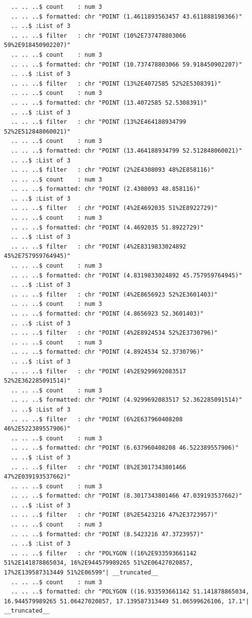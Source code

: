 \documentclass[
  letterpaper,
  DIV=11,
  numbers=noendperiod]{scrartcl}
\begin{document}
\begin{verbatim}
  .. .. ..$ count    : num 3
  .. .. ..$ formatted: chr "POINT (1.4611893563457 43.611888198366)"
  .. ..$ :List of 3
  .. .. ..$ filter   : chr "POINT (10%2E737478803066 59%2E918450902207)"
  .. .. ..$ count    : num 3
  .. .. ..$ formatted: chr "POINT (10.737478803066 59.918450902207)"
  .. ..$ :List of 3
  .. .. ..$ filter   : chr "POINT (13%2E4072585 52%2E5308391)"
  .. .. ..$ count    : num 3
  .. .. ..$ formatted: chr "POINT (13.4072585 52.5308391)"
  .. ..$ :List of 3
  .. .. ..$ filter   : chr "POINT (13%2E464188934799 52%2E512848060021)"
  .. .. ..$ count    : num 3
  .. .. ..$ formatted: chr "POINT (13.464188934799 52.512848060021)"
  .. ..$ :List of 3
  .. .. ..$ filter   : chr "POINT (2%2E4308093 48%2E858116)"
  .. .. ..$ count    : num 3
  .. .. ..$ formatted: chr "POINT (2.4308093 48.858116)"
  .. ..$ :List of 3
  .. .. ..$ filter   : chr "POINT (4%2E4692035 51%2E8922729)"
  .. .. ..$ count    : num 3
  .. .. ..$ formatted: chr "POINT (4.4692035 51.8922729)"
  .. ..$ :List of 3
  .. .. ..$ filter   : chr "POINT (4%2E8319833024892 45%2E757959764945)"
  .. .. ..$ count    : num 3
  .. .. ..$ formatted: chr "POINT (4.8319833024892 45.757959764945)"
  .. ..$ :List of 3
  .. .. ..$ filter   : chr "POINT (4%2E8656923 52%2E3601403)"
  .. .. ..$ count    : num 3
  .. .. ..$ formatted: chr "POINT (4.8656923 52.3601403)"
  .. ..$ :List of 3
  .. .. ..$ filter   : chr "POINT (4%2E8924534 52%2E3730796)"
  .. .. ..$ count    : num 3
  .. .. ..$ formatted: chr "POINT (4.8924534 52.3730796)"
  .. ..$ :List of 3
  .. .. ..$ filter   : chr "POINT (4%2E9299692083517 52%2E362285091514)"
  .. .. ..$ count    : num 3
  .. .. ..$ formatted: chr "POINT (4.9299692083517 52.362285091514)"
  .. ..$ :List of 3
  .. .. ..$ filter   : chr "POINT (6%2E637960408208 46%2E522389557906)"
  .. .. ..$ count    : num 3
  .. .. ..$ formatted: chr "POINT (6.637960408208 46.522389557906)"
  .. ..$ :List of 3
  .. .. ..$ filter   : chr "POINT (8%2E3017343801466 47%2E039193537662)"
  .. .. ..$ count    : num 3
  .. .. ..$ formatted: chr "POINT (8.3017343801466 47.039193537662)"
  .. ..$ :List of 3
  .. .. ..$ filter   : chr "POINT (8%2E5423216 47%2E3723957)"
  .. .. ..$ count    : num 3
  .. .. ..$ formatted: chr "POINT (8.5423216 47.3723957)"
  .. ..$ :List of 3
  .. .. ..$ filter   : chr "POLYGON ((16%2E933593661142 51%2E141878865034, 16%2E944579989265 51%2E06427020857, 17%2E139587313449 51%2E06599"| __truncated__
  .. .. ..$ count    : num 3
  .. .. ..$ formatted: chr "POLYGON ((16.933593661142 51.141878865034, 16.944579989265 51.06427020857, 17.139587313449 51.06599626106, 17.1"| __truncated__

\end{verbatim}
\end{document}
